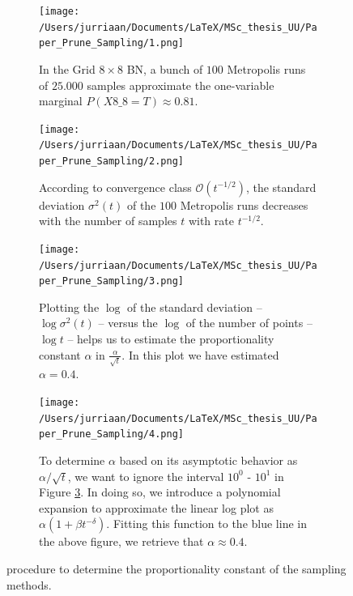 \documentclass[a4paper, twoside, 11pt]{report}
\theoremstyle{plain}
\theoremstyle{definition}
\theoremstyle{remark}
\begin{document}
\begin{figure}[H]
\centering
\begin{subfigure}[t]{0.5\textwidth}
  \centering
  \captionsetup{width = 0.9\textwidth}
  \texttt{[image: /Users/jurriaan/Documents/LaTeX/MSc\_thesis\_UU/Paper\_Prune\_Sampling/1.png]}
  \caption{In the Grid $8 \times 8$ BN, a bunch of $100$ Metropolis runs of $25.000$ samples approximate the one-variable marginal $P(X 8\_8 = T) \approx 0.81$.}
  \label{sub_a}
\end{subfigure}%
\begin{subfigure}[t]{0.5\textwidth}
  \centering
  \captionsetup{width = 0.9\textwidth}
  \texttt{[image: /Users/jurriaan/Documents/LaTeX/MSc\_thesis\_UU/Paper\_Prune\_Sampling/2.png]}
  \caption{According to convergence class $\mathcal{O}(t^{-1/2})$, the standard deviation ${\sigma}^2(t)$ of the $100$ Metropolis runs decreases with the number of samples $t$ with rate $t^{-1/2}$.}
  \label{sub_b}
\end{subfigure}

\begin{subfigure}[t]{0.5\textwidth}
  \centering
  \captionsetup{width = 0.9\textwidth}
  \texttt{[image: /Users/jurriaan/Documents/LaTeX/MSc\_thesis\_UU/Paper\_Prune\_Sampling/3.png]}
  \caption{Plotting the $\log$ of the standard deviation -- $\log {\sigma}^2(t)$ -- versus the $\log$ of the number of points -- $\log t$ -- helps us to estimate the proportionality constant $\alpha$ in $\frac{\alpha}{\sqrt{t}}$. In this plot we have estimated $\alpha = 0.4$.}
  \label{sub_c}
\end{subfigure}%
\begin{subfigure}[t]{0.5\textwidth}
  \centering
  \captionsetup{width = 0.9\textwidth}
  \texttt{[image: /Users/jurriaan/Documents/LaTeX/MSc\_thesis\_UU/Paper\_Prune\_Sampling/4.png]}
  \caption{To determine $\alpha$ based on its asymptotic behavior as $\alpha / \sqrt{t}$, we want to ignore the interval $10^0$ - $10^1$ in Figure \ref{sub_c}. In doing so, we introduce a polynomial expansion to approximate the linear log plot as $\alpha(1+\beta t^{-\delta})$. Fitting this function to the blue line in the above figure, we retrieve that $\alpha \approx 0.4$. }
  \label{sub_d}
\end{subfigure}
\caption{procedure to determine the proportionality constant of the sampling methods.}
\label{determine-c}
\end{figure}
\end{document}

